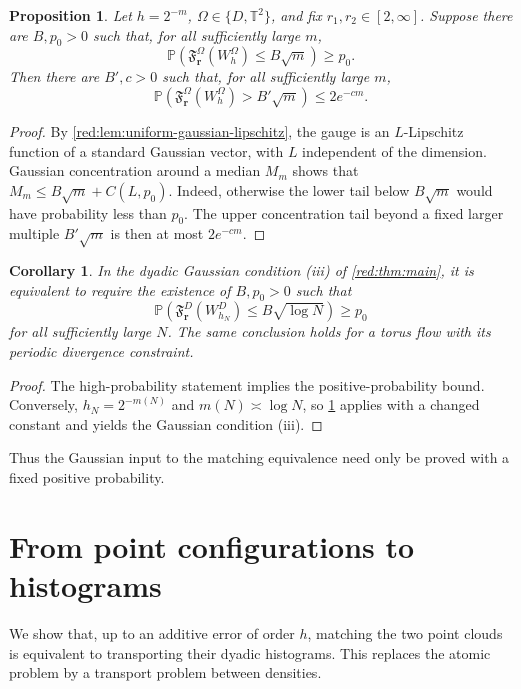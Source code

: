 \documentclass[11pt]{article}
\newtheorem{proposition}[proposition]{Proposition}
\newtheorem{corollary}[corollary]{Corollary}
\theoremstyle{definition}
\theoremstyle{remark}
\numberwithin{equation}{section}
\newcommand{\T}{\mathbb T}
\newcommand{\Pp}{\mathbb P}
\begin{document}
\begin{proposition}
\label{red:prop:gaussian-concentration}
Let $h=2^{-m}$, $\Omega\in\{D,\T^2\}$, and fix
$r_1,r_2\in[2,\infty]$. Suppose there are $B,p_0>0$ such that,
for all sufficiently large $m$,
\[
 \Pp\!\left(\mathfrak F_{\boldsymbol r}^{\Omega}(W_h^{\Omega})
 \le B\sqrt m\right)\ge p_0.
\]
Then there are $B',c>0$ such that, for all sufficiently large $m$,
\begin{equation}\label{red:eq:gaussian-concentration}
 \Pp\!\left(\mathfrak F_{\boldsymbol r}^{\Omega}(W_h^{\Omega})
 >B'\sqrt m\right)\le2e^{-cm}.
\end{equation}
\end{proposition}
\begin{proof}
By \cref{red:lem:uniform-gaussian-lipschitz}, the gauge is an
$L$-Lipschitz function of a standard Gaussian vector, with $L$
independent of the dimension. Gaussian concentration around a
median $M_m$ shows that
$M_m\le B\sqrt m+C(L,p_0)$. Indeed, otherwise the lower tail
below $B\sqrt m$ would have probability less than $p_0$.
The upper concentration tail beyond a fixed larger multiple
$B'\sqrt m$ is then at most $2e^{-cm}$.
\end{proof}

\begin{corollary}
\label{red:cor:positive-probability-equivalence}
In the dyadic Gaussian condition (iii) of \cref{red:thm:main}, it is
equivalent to require the existence of $B,p_0>0$ such that
\[
 \Pp\!\left(\mathfrak F_{\boldsymbol r}^{D}
 (W_{h_N}^{D})\le B\sqrt{\log N}\right)\ge p_0
\]
for all sufficiently large $N$. The same conclusion holds for a torus
flow with its periodic divergence constraint.
\end{corollary}
\begin{proof}
The high-probability statement implies the positive-probability bound.
Conversely, $h_N=2^{-m(N)}$ and $m(N)\asymp\log N$, so
\cref{red:prop:gaussian-concentration} applies with a changed
constant and yields the Gaussian condition (iii).
\end{proof}
Thus the Gaussian input to the matching equivalence need only be proved
with a fixed positive probability.

\section{From point configurations to histograms}

We show that, up to an additive error of order $h$, matching the two
point clouds is equivalent to transporting their dyadic histograms. This
replaces the atomic problem by a transport problem between densities.
\end{document}
